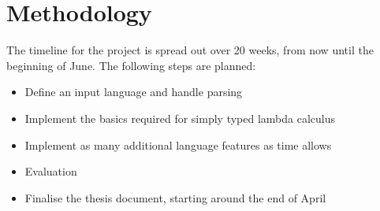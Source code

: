 \documentclass{article}
\begin{document}
\section{Methodology}

The timeline for the project is spread out over 20 weeks, from now until the beginning of June.
The following steps are planned:
\begin{itemize}
  \item Define an input language and handle parsing
  \item Implement the basics required for simply typed lambda calculus
  \item Implement as many additional language features as time allows
  \item Evaluation
  \item Finalise the thesis document, starting around the end of April %
\end{itemize}
\end{document}

